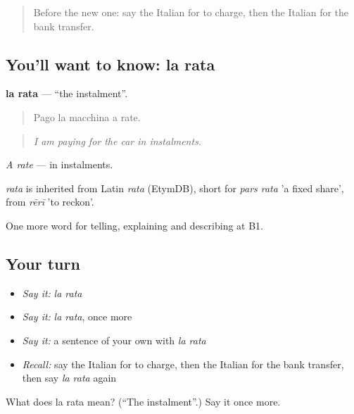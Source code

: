 \label{lesson:IT-C459-rata}



\begin{quote}
Before the new one: say the Italian for to charge, then the Italian for the bank transfer.
\end{quote}

\subsection*{You'll want to know: la rata}
\textbf{la rata} — \textquotedblleft{}the instalment\textquotedblright{}.

\begin{quote}
Pago la macchina a rate.
\end{quote}

\begin{quote}
\emph{I am paying for the car in instalments.}
\end{quote}

\emph{A rate} — in instalments.

\begin{cousinweb}
\emph{rata} is inherited from Latin \emph{rata} (EtymDB), short for \emph{pars rata} 'a fixed share', from \emph{rērī} 'to reckon'.
\end{cousinweb}

\begin{grammarlens}[title={What you've built}]
One more word for telling, explaining and describing at B1.
\end{grammarlens}

\subsection*{Your turn}
\begin{itemize}
\raggedright
  \item \emph{Say it:} \emph{la rata}
  \item \emph{Say it:} \emph{la rata}, once more
  \item \emph{Say it:} a sentence of your own with \emph{la rata}
  \item \emph{Recall:} say the Italian for to charge, then the Italian for the bank transfer, then say \emph{la rata} again
\end{itemize}

\begin{tcolorbox}[breakable,colback=teal!4,colframe=teal!35!black,title={Before you move on}]
What does la rata mean? (\textquotedblleft{}The instalment\textquotedblright{}.) Say it once more.
\end{tcolorbox}
